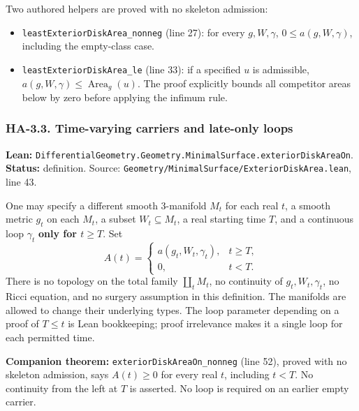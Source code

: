\documentclass[
  letterpaper,
  11pt]{article}
\providecommand{\tightlist}{%
  \setlength{\itemsep}{0pt}\setlength{\parskip}{0pt}}
\begin{document}
Two authored helpers are proved with no skeleton admission:

\begin{itemize}
\tightlist
\item
  {\small\texttt{least\allowbreak{}Exterior\allowbreak{}Disk\allowbreak{}Area\_\allowbreak{}nonneg}}
  (line 27): for every \(g,W,\gamma\), \(0\le a(g,W,\gamma)\), including
  the empty-class case.
\item
  {\small\texttt{least\allowbreak{}Exterior\allowbreak{}Disk\allowbreak{}Area\_\allowbreak{}le}}
  (line 33): if a specified \(u\) is admissible,
  \(a(g,W,\gamma)\le\operatorname{Area}_g(u)\). The proof explicitly
  bounds all competitor areas below by zero before applying the infimum
  rule.
\end{itemize}

\subsubsection{HA-3.3. Time-varying carriers and late-only
loops}\label{ha-3-3}

\textbf{Lean:}
{\small\texttt{Differential\allowbreak{}Geometry.\allowbreak{}Geometry.\allowbreak{}Minimal\allowbreak{}Surface.\allowbreak{}exterior\allowbreak{}Disk\allowbreak{}Area\allowbreak{}On}}.
\textbf{Status:} definition. Source:
{\small\texttt{Geometry/\allowbreak{}Minimal\allowbreak{}Surface/\allowbreak{}Exterior\allowbreak{}Disk\allowbreak{}Area.\allowbreak{}lean}},
line 43.

One may specify a different smooth 3-manifold \(M_t\) for each real
\(t\), a smooth metric \(g_t\) on each \(M_t\), a subset
\(W_t\subseteq M_t\), a real starting time \(T\), and a continuous loop
\(\gamma_t\) \textbf{only for \(t\ge T\)}. Set \[
 A(t)=\begin{cases}
       a(g_t,W_t,\gamma_t),&t\ge T,\\
       0,&t<T.
      \end{cases}
\] There is no topology on the total family \(\coprod_tM_t\), no
continuity of \(g_t,W_t,\gamma_t\), no Ricci equation, and no surgery
assumption in this definition. The manifolds are allowed to change their
underlying types. The loop parameter depending on a proof of \(T\le t\)
is Lean bookkeeping; proof irrelevance makes it a single loop for each
permitted time.

\textbf{Companion theorem:}
{\small\texttt{exterior\allowbreak{}Disk\allowbreak{}Area\allowbreak{}On\_\allowbreak{}nonneg}}
(line 52), proved with no skeleton admission, says \(A(t)\ge0\) for
every real \(t\), including \(t<T\). No continuity from the left at
\(T\) is asserted. No loop is required on an earlier empty carrier.
\end{document}
